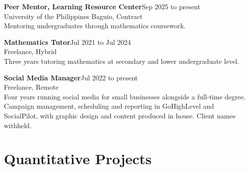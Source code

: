 \documentclass[10pt,a4paper]{article}
\newcommand{\entry}[3]{%
  \textbf{#1}\hfill{\small\textcolor{muted}{#3}}\\[1pt]
  {\small\textcolor{accent}{#2}}\\[2pt]
}
\begin{document}
\vspace{3pt}
\entry{Peer Mentor, Learning Resource Center}{University of the Philippines Baguio, Contract}{Sep 2025 to present}
{\small Mentoring undergraduates through mathematics coursework.}

\vspace{3pt}
\entry{Mathematics Tutor}{Freelance, Hybrid}{Jul 2021 to Jul 2024}
{\small Three years tutoring mathematics at secondary and lower undergraduate level.}

\vspace{3pt}
\entry{Social Media Manager}{Freelance, Remote}{Jul 2022 to present}
{\small Four years running social media for small businesses alongside a full-time degree.
Campaign management, scheduling and reporting in GoHighLevel and SocialPilot, with graphic
design and content produced in house. Client names withheld.}

\section{Quantitative Projects}
\end{document}
